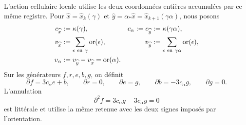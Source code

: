 L'action cellulaire locale utilise les deux coordonnées entières accumulées par ce même registre. Pour \(\widehat x=\widehat x_k(\gamma)\) et \(\widehat y=\alpha_*\widehat x=\widehat x_{k+1}(\gamma\alpha)\), nous posons
\begin{equation}
\label{eq:pdfv2-cor-c-v}
 \begin{aligned}
 c_{\widehat x}&:=\kappa(\gamma), &
 c_\alpha:=c_{\widehat y}&:=\kappa(\gamma\alpha),\\
 v_{\widehat x}&:=\sum_{\epsilon\ {\rm en}\ \gamma}
                  \operatorname{or}(\epsilon), &
 v_{\widehat y}&:=\sum_{\epsilon\ {\rm en}\ \gamma\alpha}
                  \operatorname{or}(\epsilon),\\
 v_\alpha&:=v_{\widehat y}-v_{\widehat x}
           =\operatorname{or}(\alpha).&&
 \end{aligned}
\end{equation}
Sur les générateurs \(f,r,e,b,g\), on définit
\begin{equation}
\label{eq:pdfv2-cor-complejo-local}
 \partial f=3c_\alpha e+b,\qquad
 \partial r=0,\qquad
 \partial e=g,\qquad
 \partial b=-3c_\alpha g,\qquad
 \partial g=0.
\end{equation}
L'annulation
\begin{equation}
\label{eq:pdfv2-cor-dos-cero}
 \partial^2f=3c_\alpha g-3c_\alpha g=0
\end{equation}
est littérale et utilise la même retenue avec les deux signes imposés par l'orientation.

